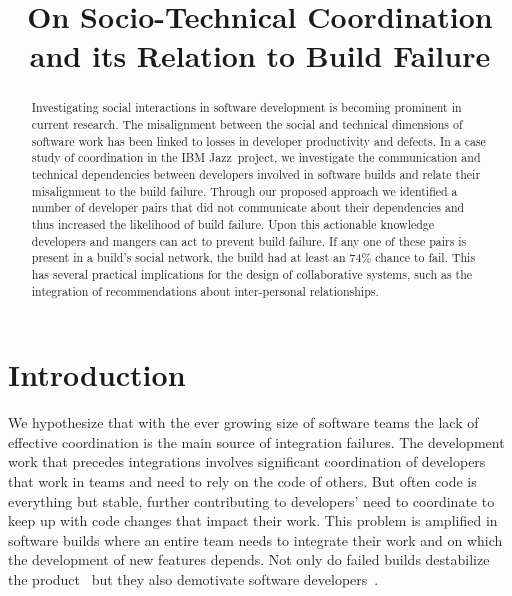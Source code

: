 \documentclass[conference]{IEEEtran}
\begin{document}
\title{On Socio-Technical Coordination and its Relation to Build Failure}


\author{
\and
{}
}

\maketitle


\begin{abstract}
Investigating social interactions in software development is becoming 
prominent in current research. The misalignment
between the social and technical dimensions of software work has been
linked to losses in developer productivity and defects. In a case study of
coordination in the IBM Jazz\texttrademark\ project, we investigate the
communication and technical dependencies between developers involved in
software builds and relate their misalignment to the build failure.  
Through our proposed approach we identified a number of developer pairs that did not communicate about their dependencies and thus increased the likelihood of build failure. 
Upon this actionable knowledge developers and mangers can act to prevent build failure. 
If any one of these pairs is present in a build's social network, the build had at least an 74\% chance to fail. 
This has several practical implications for the design of collaborative systems, such as the integration of recommendations about inter-personal relationships.
\end{abstract}


\IEEEpeerreviewmaketitle

\section{Introduction}
We hypothesize that with the ever growing size of software teams the lack of
effective coordination is the main source of integration failures. The
development work that precedes integrations involves significant coordination of
developers that work in teams and need to rely on the code of others. 
But often code is everything but stable, further contributing to
developers' need to coordinate to keep up with code changes that impact their work. This problem is
amplified in software builds where an entire team needs to integrate their work
and on which the development of new features depends. Not only do
failed builds destabilize the product~\cite{cusumano1997} but they also demotivate
software developers~\cite{holck2004}.
\end{document}
